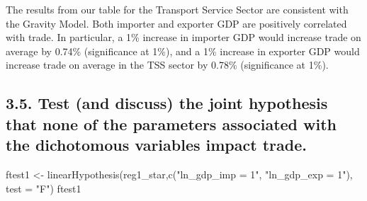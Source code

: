 \documentclass[
]{article}
\newenvironment{Shaded}{\begin{snugshade}}{\end{snugshade}}
\newcommand{\AttributeTok}[1]{\textcolor[rgb]{0.77,0.63,0.00}{#1}}
\newcommand{\CommentTok}[1]{\textcolor[rgb]{0.56,0.35,0.01}{\textit{#1}}}
\newcommand{\FunctionTok}[1]{\textcolor[rgb]{0.00,0.00,0.00}{#1}}
\newcommand{\NormalTok}[1]{#1}
\newcommand{\OtherTok}[1]{\textcolor[rgb]{0.56,0.35,0.01}{#1}}
\newcommand{\SpecialCharTok}[1]{\textcolor[rgb]{0.00,0.00,0.00}{#1}}
\newcommand{\StringTok}[1]{\textcolor[rgb]{0.31,0.60,0.02}{#1}}
\begin{document}
The results from our table for the Transport Service Sector are
consistent with the Gravity Model. Both importer and exporter GDP are
positively correlated with trade. In particular, a 1\% increase in
importer GDP would increase trade on average by 0.74\% (significance at
1\%), and a 1\% increase in exporter GDP would increase trade on average
in the TSS sector by 0.78\% (significance at 1\%).

\hypertarget{test-and-discuss-the-joint-hypothesis-that-none-of-the-parameters-associated-with-the-dichotomous-variables-impact-trade.}{%
\subsection{3.5. Test (and discuss) the joint hypothesis that none of
the parameters associated with the dichotomous variables impact
trade.}\label{test-and-discuss-the-joint-hypothesis-that-none-of-the-parameters-associated-with-the-dichotomous-variables-impact-trade.}}

\begin{Shaded}
\end{Shaded}

\begin{Shaded}
\begin{Highlighting}[]
\NormalTok{ftest1 }\OtherTok{\textless{}{-}} \FunctionTok{linearHypothesis}\NormalTok{(reg1\_star,}\FunctionTok{c}\NormalTok{(}\StringTok{"ln\_gdp\_imp = 1"}\NormalTok{,}
\StringTok{"ln\_gdp\_exp = 1"}\NormalTok{), }\AttributeTok{test =} \StringTok{"F"}\NormalTok{)}
\NormalTok{ftest1}
\end{Highlighting}
\end{Shaded}
\end{document}
